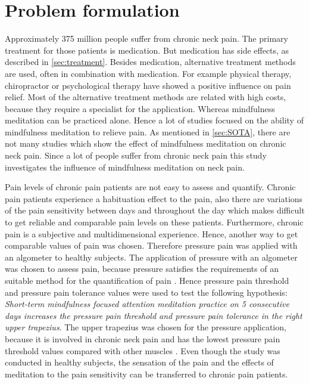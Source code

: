 \chapter{Problem formulation}

Approximately 375 million people suffer from chronic neck pain. The primary treatment for those patients is medication. But medication has side effects, as described in \ref{sec:treatment}.  Besides medication, alternative treatment methods are used, often in combination with medication. For example physical therapy, chiropractor or psychological therapy have showed a positive influence on pain relief. Most of the alternative treatment methods are related with high costs, because they require a specialist for the application. Whereas mindfulness meditation can be practiced alone. Hence a lot of studies focused on the ability of mindfulness meditation to relieve pain.
As mentioned in \ref{sec:SOTA}, there are not many studies which show the effect of mindfulness meditation on chronic neck pain. Since a lot of people suffer from chronic neck pain this study investigates the influence of mindfulness meditation on neck pain. 


Pain levels of chronic pain patients are not easy to assess and quantify. Chronic pain patients experience a habituation effect to the pain, also there are variations of the pain sensitivity between days and throughout the day which makes difficult to get reliable and comparable pain levels on these patients. Furthermore, chronic pain is a subjective and multidimensional experience.
Hence, another way to get comparable values of pain was chosen. Therefore pressure pain was applied with an algometer to healthy subjects. The application of pressure with an algometer was chosen to assess pain, because pressure satisfies the requirements of an suitable method for the quantification of pain \cite{Keele1954}. Hence pressure pain threshold and pressure pain tolerance values were used to test the following hypothesis:
\textit{Short-term mindfulness focused attention meditation practice on 5 consecutive days increases the pressure pain threshold and pressure pain tolerance in the right upper trapezius}. The upper trapezius was chosen for the pressure application, because it is involved in chronic neck pain and has the lowest pressure pain threshold values compared with other muscles \cite{Falla2004,Fischer1987}. Even though the study was conducted in healthy subjects, the sensation of the pain and the effects of meditation to the pain sensitivity can be transferred to chronic pain patients.


